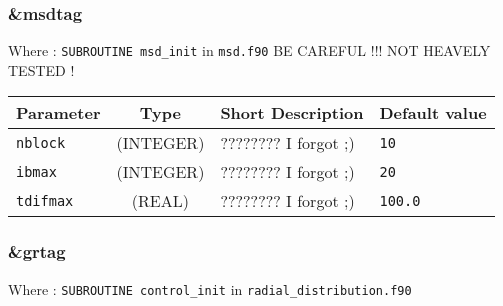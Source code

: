 \documentclass[a4paper]{article}
\begin{document}

\subsubsection{\&msdtag}

Where : \verb?SUBROUTINE msd_init? in \verb?msd.f90?
BE CAREFUL !!! NOT HEAVELY TESTED !
\newline

\begin{longtable}{l|c|m{8cm}|m{2cm}}
\hline
\hline
Parameter        &  Type              &          Short Description                                                          & Default value \\
\hline
\hline
\rule[-0.75cm]{0cm}{1.5cm}
\verb?nblock?    & (INTEGER)          & ???????? I forgot ;)                                                                & \verb?10? \\
\hline
\rule[-0.75cm]{0cm}{1.5cm}
\verb?ibmax?     &  (INTEGER)         & ???????? I forgot ;)                                                                & \verb?20? \\
\hline
\rule[-0.75cm]{0cm}{1.5cm}
\verb?tdifmax?   & (REAL)             & ???????? I forgot ;)                                                                & \verb?100.0? \\
\hline
\hline
\end{longtable}


\subsubsection{\&grtag}

Where : \verb?SUBROUTINE control_init? in \verb?radial_distribution.f90?
\newline
\end{document}
